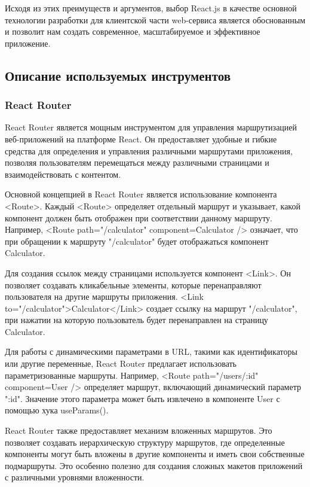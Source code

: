 Исходя из этих преимуществ и аргументов, выбор React.js в качестве основной технологии разработки для клиентской части web-сервиса является обоснованным и позволит нам создать современное, масштабируемое и эффективное приложение.

\subsection{Описание используемых инструментов}

\subsubsection{React Router}

React Router является мощным инструментом для управления маршрутизацией веб-приложений на платформе React. Он предоставляет удобные и гибкие средства для определения и управления различными маршрутами приложения, позволяя пользователям перемещаться между различными страницами и взаимодействовать с контентом.

Основной концепцией в React Router является использование компонента <Route>. Каждый <Route> определяет отдельный маршрут и указывает, какой компонент должен быть отображен при соответствии данному маршруту. Например, <Route path="/calculator" component={Calculator} /> означает, что при обращении к маршруту "/calculator" будет отображаться компонент Calculator.

Для создания ссылок между страницами используется компонент <Link>. Он позволяет создавать кликабельные элементы, которые перенаправляют пользователя на другие маршруты приложения. <Link to="/calculator">Calculator</Link> создает ссылку на маршрут "/calculator", при нажатии на которую пользователь будет перенаправлен на страницу Calculator.

Для работы с динамическими параметрами в URL, такими как идентификаторы или другие переменные, React Router предлагает использовать параметризованные маршруты. Например, <Route path="/users/:id" component={User} /> определяет маршрут, включающий динамический параметр ":id". Значение этого параметра может быть извлечено в компоненте User с помощью хука useParams().

React Router также предоставляет механизм вложенных маршрутов. Это позволяет создавать иерархическую структуру маршрутов, где определенные компоненты могут быть вложены в другие компоненты и иметь свои собственные подмаршруты. Это особенно полезно для создания сложных макетов приложений с различными уровнями вложенности.

